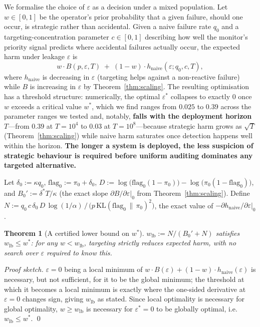 \documentclass[sigconf,anonymous]{aamas}
\theoremstyle{plain}
\newtheorem{theorem}{Theorem}
\theoremstyle{definition}
\begin{document}
We formalise the choice of $\varepsilon$ as a decision under a mixed
population. Let $w \in [0,1]$ be the operator's prior probability that a
given failure, should one occur, is strategic rather than accidental. Given
a naive failure rate $q_0$ and a targeting-concentration parameter $c \in
[0,1]$ describing how well the monitor's priority signal predicts where
accidental failures actually occur, the expected harm under leakage
$\varepsilon$ is
\[w \cdot B(p,\varepsilon,T) \;+\; (1-w)\cdot h_{\mathrm{naive}}(\varepsilon; q_0, c, T),\]
where $h_{\mathrm{naive}}$ is decreasing in $\varepsilon$ (targeting helps
against a non-reactive failure) while $B$ is increasing in $\varepsilon$ by
Theorem~\ref{thm:scaling}. The resulting optimisation has a threshold
structure: numerically, the optimal $\varepsilon^*$ collapses to exactly $0$
once $w$ exceeds a critical value $w^*$, which we find ranges from $0.025$
to $0.39$ across the parameter ranges we tested and, notably,
\textbf{falls with the deployment horizon} $T$---from $0.39$ at $T=10^4$ to
$0.03$ at $T=10^8$---because strategic harm grows as $\sqrt{T}$
(Theorem~\ref{thm:scaling}) while naive harm saturates once detection
happens well within the horizon. \textbf{The longer a system is deployed,
the less suspicion of strategic behaviour is required before uniform
auditing dominates any targeted alternative.}

Let $\delta_0 := \kappa q_0$, $\mathrm{flag}_0 := \pi_0+\delta_0$,
$D := \log\!\big(\mathrm{flag}_0(1-\pi_0)\big) - \log\!\big(\pi_0(1-\mathrm{flag}_0)\big)$,
and $B_0' := \delta^*T/\kappa$ (the exact slope
$\partial B/\partial\varepsilon|_0$ from Theorem~\ref{thm:scaling}). Define
$N := q_0\, c\, \delta_0\, D\, \log(1/\alpha) \,/\, \big(p\,\mathrm{KL}(\mathrm{flag}_0\,\|\,\pi_0)^2\big)$,
the exact value of $-\partial h_{\mathrm{naive}}/\partial\varepsilon|_0$.

\begin{theorem}[A certified lower bound on $w^*$]
\label{thm:w-lower-bound}
$w_{\mathrm{lb}} := N/(B_0' + N)$ satisfies $w_{\mathrm{lb}} \le w^*$: for
any $w < w_{\mathrm{lb}}$, targeting strictly reduces expected harm, with no
search over $\varepsilon$ required to know this.
\end{theorem}

\begin{proof}[Proof sketch]
$\varepsilon=0$ being a local minimum of $w\cdot B(\varepsilon) +
(1-w)\cdot h_{\mathrm{naive}}(\varepsilon)$ is necessary, but not
sufficient, for it to be the global minimum; the threshold at which it
becomes a local minimum is exactly where the one-sided derivative at
$\varepsilon=0$ changes sign, giving $w_{\mathrm{lb}}$ as stated. Since
local optimality is necessary for global optimality, $w \ge w_{\mathrm{lb}}$
is necessary for $\varepsilon^*=0$ to be globally optimal, i.e.\
$w_{\mathrm{lb}} \le w^*$. \qed
\end{proof}
\end{document}
